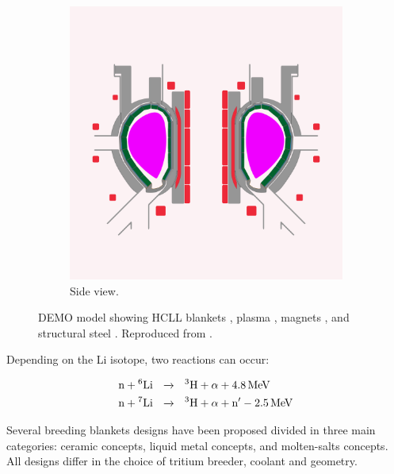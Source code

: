 \begin{figure}
\begin{subfigure}{0.45\linewidth}
        \includegraphics{Figures/Chapter1/blanket_shimwell_side_view.png}
        \caption{Side view.}
    \end{subfigure}
    \caption{DEMO model showing HCLL blankets \cruleme[lithiumgreen]{0.3cm}{0.3cm}, plasma \cruleme[plasmapink]{0.3cm}{0.3cm}, magnets \cruleme[magnetred]{0.3cm}{0.3cm}, and structural steel \cruleme[steelgray]{0.3cm}{0.3cm}. Reproduced from \cite{shimwell_multiphysics_2019}.}
\end{figure}

Depending on the \gls{Li} \gls{isotope}, two reactions can occur:

\begin{align}
    \text{n} + \text{\textsuperscript{6}Li}  \ \ &\xrightarrow{} \ \ \text{\textsuperscript{3}H} + \alpha + \SI{4.8}{MeV}\\
    \text{n} + \text{\textsuperscript{7}Li}  \ \ &\xrightarrow{} \ \ \text{\textsuperscript{3}H} + \alpha + \text{n}' - \SI{2.5}{MeV} 
\end{align}

Several \glspl{breeding blanket} designs have been proposed divided in three main categories: ceramic concepts, liquid metal concepts, and molten-salts concepts.
All designs differ in the choice of tritium breeder, coolant and geometry.

